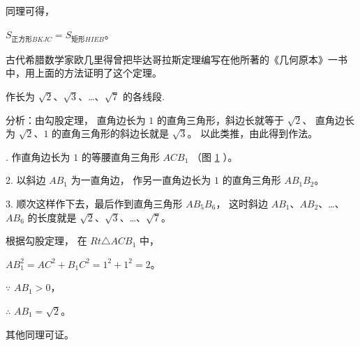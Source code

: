 同理可得，

\qquad $S_{\text{正方形} BKJC} = S_{\text{矩形} HIEB}$。


古代希腊数学家欧几里得曾把毕达哥拉斯定理编写在他所著的《几何原本》一书中，用上面的方法证明了这个定理。

\begin{figure}[htbp]
    \centering
    \begin{minipage}[b]{7cm}
        \centering
        
        \caption{}\label{fig:czjh1-5-19}
    \end{minipage}
    \qquad
    \begin{minipage}[b]{7cm}
        \centering
        
        \caption{}\label{fig:czjh1-5-20}
    \end{minipage}
\end{figure}


\liti 作长为 $\sqrt{2}$、$\sqrt{3}$、…、$\sqrt{7}$ 的各线段.

分析：由勾股定理，
直角边长为 $1$ 的直角三角形，斜边长就等于 $\sqrt{2}$、
直角边长为 $\sqrt{2}$、$1$ 的直角三角形的斜边长就是 $\sqrt{3}$。
以此类推，由此得到作法。


. 作直角边长为 $1$ 的等腰直角三角形 $ACB_1$ （图 \ref{fig:czjh1-5-20} ）。

2. 以斜边 $AB_1$ 为一直角边， 作另一直角边长为 $1$ 的直角三角形 $AB_1B_2$。

3. 顺次这样作下去，最后作到直角三角形 $AB_5B_6$， 这时斜边 $AB_1$、$AB_2$、…、$AB_6$
的长度就是 $\sqrt{2}$、$\sqrt{3}$、…、$\sqrt{7}$。

\zhengming 根据勾股定理， 在 $Rt \triangle ACB_1$ 中，

$AB_1^2 = AC^2 + B_1C^2 = 1^2 + 1^2 = 2$。

$\because$ \quad $AB_1 > 0$，

$\therefore$ \quad $AB_1 = \sqrt{2}$。

其他同理可证。


\begin{lianxi}




\end{lianxi}

